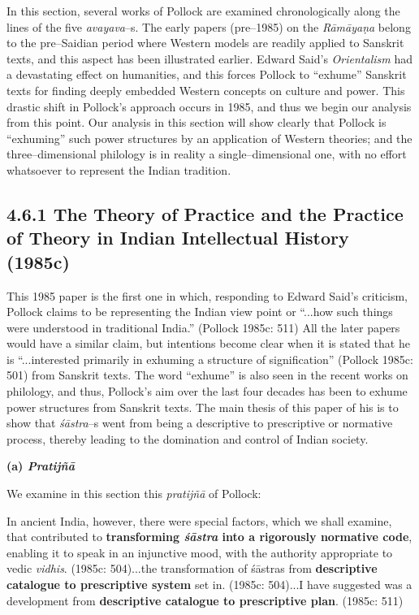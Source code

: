 \vspace{-.2cm}

In this section, several works of Pollock are examined chronologically along the lines of the five \textit{avayava}–s. The early papers (pre–1985) on the \textit{Rāmāyaṇa} belong to the pre–Saidian period where Western models are readily applied to Sanskrit texts, and this aspect has been illustrated earlier. Edward Said’s \textit{Orientalism }had a devastating effect on humanities, and this forces Pollock to “exhume” Sanskrit texts for finding deeply embedded Western concepts on culture and power. This drastic shift in Pollock’s approach occurs in 1985, and thus we begin our analysis from this point. Our analysis in this section will show clearly that Pollock is “exhuming” such power structures by an application of Western theories; and the three–dimensional philology is in reality a single–dimensional one, with no effort whatsoever to represent the Indian tradition.

\vspace{-.3cm}

\subsection*{4.6.1 The Theory of Practice and the Practice of Theory in Indian Intellectual History (1985c)}

\vspace{-.2cm}

This 1985 paper is the first one in which, responding to Edward Said’s criticism, Pollock claims to be representing the Indian view point or “...how such things were understood in traditional India.” (Pollock 1985c: 511) All the later papers would have a similar claim, but intentions become clear when it is stated that he is “...interested primarily in exhuming a structure of signification” (Pollock 1985c: 501) from Sanskrit texts. The word “exhume” is also seen in the recent works on philology, and thus, Pollock’s aim over the last four decades has been to exhume power structures from Sanskrit texts. The main thesis of this paper of his is to show that \textit{śāstra}–s went from being a descriptive to prescriptive or normative process, thereby leading to the domination and control of Indian society.

\textbf{(a) \textit{Pratijñā }}

We examine in this section this \textit{pratijñā} of Pollock:

\begin{myquote}
In ancient India, however, there were special factors, which we shall examine, that contributed to \textbf{transforming \textit{śāstra} into a rigorously normative code}, enabling it to speak in an injunctive mood, with the authority appropriate to vedic \textit{vidhis}. (1985c: 504)...the transformation of śāstras from \textbf{descriptive catalogue to prescriptive system} set in. (1985c: 504)...I have suggested was a development from \textbf{descriptive catalogue to prescriptive plan}. (1985c: 511)
\end{myquote}

